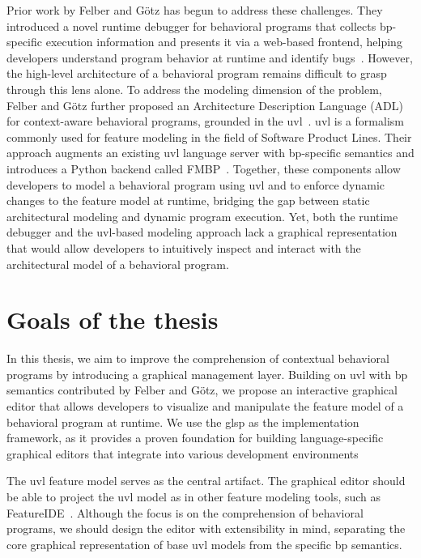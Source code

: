 Prior work by Felber and Götz has begun to address these challenges.
They introduced a novel runtime debugger for behavioral programs that collects \gls{bp}-specific execution information and presents it via a web-based frontend, helping developers understand program behavior at runtime and identify bugs~\cite{felber_debugging_2024}.
However, the high-level architecture of a behavioral program remains difficult to grasp through this lens alone.
To address the modeling dimension of the problem, Felber and Götz further proposed an Architecture Description Language (ADL) for context-aware behavioral programs, grounded in the \gls{uvl}~\cite{felber_behavioral_2025}.
\gls{uvl} is a formalism commonly used for feature modeling in the field of Software Product Lines.
Their approach augments an existing \gls{uvl} language server with \gls{bp}-specific semantics and introduces a Python backend called FMBP~\cite{felber_comprehensible_2025}.
Together, these components allow developers to model a behavioral program using \gls{uvl} and to enforce dynamic changes to the feature model at runtime, bridging the gap between static architectural modeling and dynamic program execution.
Yet, both the runtime debugger and the \gls{uvl}-based modeling approach lack a graphical representation that would allow developers to intuitively inspect and interact with the architectural model of a behavioral program.

\section{Goals of the thesis}
\label{sec:intro_goals}

In this thesis, we aim to improve the comprehension of contextual behavioral programs by introducing a graphical management layer.
Building on \gls{uvl} with \gls{bp} semantics contributed by Felber and Götz, we propose an interactive graphical editor that allows developers to visualize and manipulate the feature model of a behavioral program at runtime.
We use the \gls{glsp} as the implementation framework, as it provides a proven foundation for building language-specific graphical editors that integrate into various development environments~\cite{bork_vision_2024}

The \gls{uvl} feature model serves as the central artifact.
The graphical editor should be able to project the \gls{uvl} model as in other feature modeling tools, such as FeatureIDE~\cite{sundermann_integration_2021}.
Although the focus is on the comprehension of behavioral programs, we should design the editor with extensibility in mind, separating the core graphical representation of base \gls{uvl} models from the specific \gls{bp} semantics.

